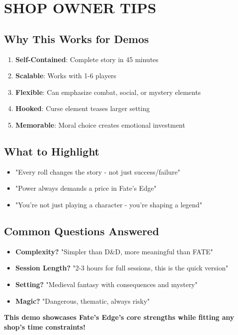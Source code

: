 \documentclass[11pt]{article}
\begin{document}
\section{SHOP OWNER TIPS}

\subsection*{Why This Works for Demos}
\begin{enumerate}
\item \textbf{Self-Contained}: Complete story in 45 minutes
\item \textbf{Scalable}: Works with 1-6 players
\item \textbf{Flexible}: Can emphasize combat, social, or mystery elements
\item \textbf{Hooked}: Curse element teases larger setting
\item \textbf{Memorable}: Moral choice creates emotional investment
\end{enumerate}

\subsection*{What to Highlight}
\begin{itemize}
\item "Every roll changes the story - not just success/failure"
\item "Power always demands a price in Fate's Edge"
\item "You're not just playing a character - you're shaping a legend"
\end{itemize}

\subsection*{Common Questions Answered}
\begin{itemize}
\item \textbf{Complexity?} "Simpler than D&D, more meaningful than FATE"
\item \textbf{Session Length?} "2-3 hours for full sessions, this is the quick version"
\item \textbf{Setting?} "Medieval fantasy with consequences and mystery"
\item \textbf{Magic?} "Dangerous, thematic, always risky"
\end{itemize}

\begin{center}
\textbf{This demo showcases Fate's Edge's core strengths while fitting any shop's time constraints!}
\end{center}
\end{document}

